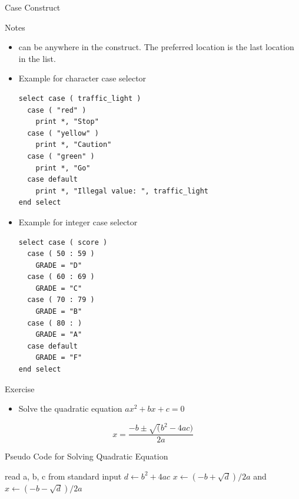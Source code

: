 \documentclass[10pt,t]{beamer}
\begin{document}
\begin{frame}{Case Construct}
\begin{ablock}{Notes}
\begin{itemize}
      \item {} can be anywhere in the  construct. The preferred location is the last location in the  list.
    \end{itemize}
  \end{ablock}
  \framebreak
  \begin{itemize}
    \item Example for character case selector
      \begin{lstlisting}[language={[90]Fortran},basicstyle=\fontsize{6}{7}\selectfont\ttfamily]
select case ( traffic_light )
  case ( "red" )
    print *, "Stop"
  case ( "yellow" )
    print *, "Caution"
  case ( "green" )
    print *, "Go"
  case default
    print *, "Illegal value: ", traffic_light
end select 
      \end{lstlisting}
    \item Example for integer case selector
      \begin{lstlisting}[language={[90]Fortran},basicstyle=\fontsize{6}{7}\selectfont\ttfamily]
select case ( score )
  case ( 50 : 59 )
    GRADE = "D"
  case ( 60 : 69 )
    GRADE = "C"
  case ( 70 : 79 )
    GRADE = "B"
  case ( 80 : ) 
    GRADE = "A"
  case default
    GRADE = "F"
end select
      \end{lstlisting}
  \end{itemize}
\end{frame}

\begin{frame}{Exercise}
  \begin{itemize}
  \item Solve the quadratic equation $ax^2 + bx + c = 0$
  \end{itemize}
    \begin{equation*}
      x = \frac{-b \pm \sqrt(b^2 - 4ac)}{2a}
    \end{equation*}
  \begin{algorithm}[H]
    \caption{Pseudo Code for Solving Quadratic Equation}
    \begin{algorithmic}
      \State read a, b, c from standard input
      \State $d \gets b^2 + 4ac$
      \State $x \gets (-b + \sqrt{d})/2a$ and $x \gets (-b -\sqrt{d})/2a$
    \end{algorithmic}
  \end{algorithm}
\end{frame}
  
\end{document}

